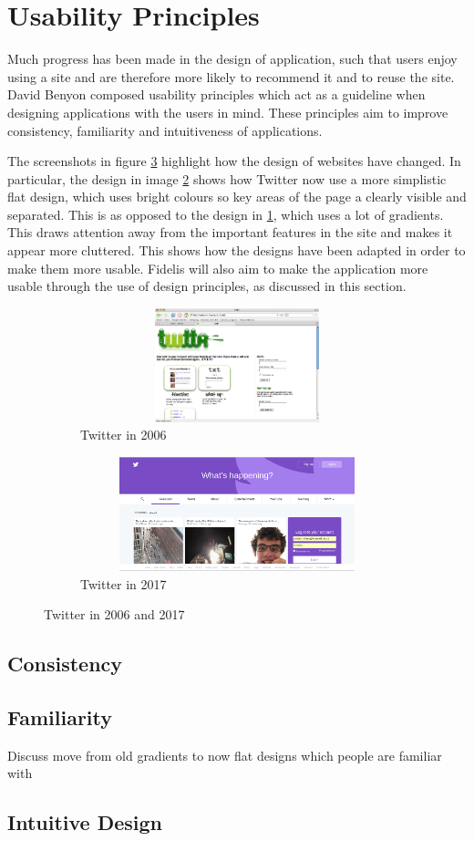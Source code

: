 \section{Usability Principles}
Much progress has been made in the design of application, such that users enjoy using a site and are therefore more likely to recommend it and to reuse the site. David Benyon composed usability principles which act as a guideline when designing applications with the users in mind. These principles aim to improve consistency, familiarity and intuitiveness of applications.

The screenshots in figure \ref{fig:Twitter_Changes} highlight how the design of websites have changed. In particular, the design in image \ref{fig:Twitter_2017} shows how Twitter now use a more simplistic flat design, which uses bright colours so key areas of the page a clearly visible and separated. This is as opposed to the design in \ref{fig:Twitter_2006}, which uses a lot of gradients. This draws attention away from the important features in the site and makes it appear more cluttered. This shows how the designs have been adapted in order to make them more usable. Fidelis will also aim to make the application more usable through the use of design principles, as discussed in this section.

\begin{figure}[H]
	\centering
	\begin{subfigure}[t]{0.45\textwidth}
		\centering
		\includegraphics[width=1.0\textwidth, height=125px]{Images/Design/Twitter_2006}
		\caption{Twitter in 2006}\label{fig:Twitter_2006}		
	\end{subfigure}
	\quad
	\begin{subfigure}[t]{0.45\textwidth}
		\centering
		\includegraphics[width=1.0\textwidth, height=125px]{Images/Design/Twitter_2017}
		\caption{Twitter in 2017}\label{fig:Twitter_2017}
	\end{subfigure}
	\caption{Twitter in 2006 and 2017}\label{fig:Twitter_Changes}
\end{figure}

\subsection{Consistency}

\subsection{Familiarity}
Discuss move from old gradients to now flat designs which people are familiar with

\subsection{Intuitive Design}